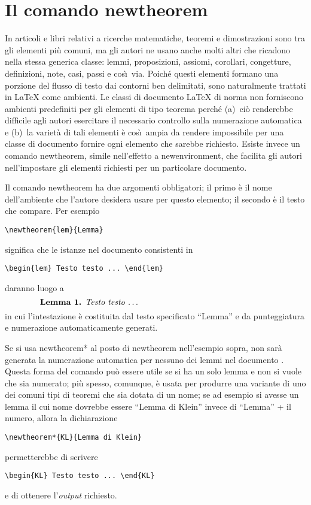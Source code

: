\documentclass[a4paper]{article}
\providecommand{\qq}[1]{\textquotedblleft#1\textquotedblright}
\newcommand{\ntt}{%
  \fontfamily\ttdefault \fontseries\mddefault \fontshape\updefault
  \selectfont
}
\DeclareRobustCommand{\cn}[1]{{\ntt\bslchar#1}}
\def\latex/{{\protect\LaTeX}}
\begin{document}
\section{Il comando \cn{newtheorem}}

In articoli e libri relativi a ricerche matematiche, teoremi
e dimostrazioni sono tra gli elementi pi\`u
comuni, ma gli autori ne usano anche molti altri che ricadono nella
stessa generica classe: lemmi, proposizioni, assiomi, corollari,
congetture, definizioni, note, casi, passi e cos\`\i\ via. Poich\'e questi
elementi formano una porzione del flusso di testo dai contorni ben
delimitati, sono naturalmente trattati in
\latex/ come ambienti. Le classi di documento \latex/ di norma non
forniscono ambienti predefiniti per gli elementi di tipo teorema perch\'e
(a)~ci\`o renderebbe difficile agli autori esercitare il necessario
controllo sulla numerazione automatica e (b)~la variet\`a di tali
elementi \`e cos\`\i\ ampia da rendere impossibile per una
classe di documento fornire ogni elemento che sarebbe richiesto. Esiste
invece un comando
\cn{newtheorem}, simile nell'effetto a \cn{newenvironment}, che facilita
gli autori nell'impostare gli elementi richiesti per un particolare documento.

Il comando \cn{newtheorem} ha due argomenti obbligatori; il primo \`e il
nome dell'ambiente che l'autore desidera usare per questo elemento; il
secondo \`e il testo che compare. Per esempio
\begin{verbatim}
\newtheorem{lem}{Lemma}
\end{verbatim}
significa che le istanze nel documento consistenti in
\begin{verbatim}
\begin{lem} Testo testo ... \end{lem}
\end{verbatim}
daranno luogo a
\[\makebox[.8\columnwidth]{%
  \textbf{Lemma 1.} \textit{Testo testo \dots}\hfill}\]
in cui l'intestazione \`e costituita dal testo specificato \qq{Lemma} e da
punteggiatura e numerazione automaticamente generati.

Se si usa \cn{newtheorem*} al posto di \cn{newtheorem} nell'esempio
sopra, non sar\`a generata la numerazione automatica per nessuno dei
lemmi nel documento . Questa forma del comando pu\`o essere utile se si
ha un solo lemma e non si vuole che sia numerato; pi\`u spesso,
comunque, \`e usata per produrre una variante di uno dei comuni tipi di
teoremi che sia dotata di un nome; se ad esempio si avesse un lemma il cui
nome dovrebbe essere \qq{Lemma di Klein} invece di \qq{Lemma} +
il numero, allora la dichiarazione
\begin{verbatim}
\newtheorem*{KL}{Lemma di Klein}
\end{verbatim}
permetterebbe di scrivere
\begin{verbatim}
\begin{KL} Testo testo ... \end{KL}
\end{verbatim}
e di ottenere l'\emph{output} richiesto.
\end{document}
